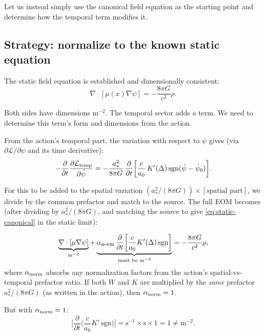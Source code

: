 \documentclass[11pt]{article}
\begin{document}
Let us instead simply use the canonical field equation as the starting point and determine how the temporal term modifies it.

\subsection{Strategy: normalize to the known static equation}

The static field equation is established and dimensionally consistent:
\begin{equation}
\nabla\cdot[\mu(x)\nabla\psi] = -\frac{8\pi G}{c^2}\rho.
\label{eq:static-canonical}
\end{equation}

Both sides have dimensions $\text{m}^{-2}$. The temporal sector adds a term. We need to determine this term's form and dimensions from the action.

From the action's temporal part, the variation with respect to $\psi$ gives (via $\partial\mathcal{L}/\partial\dot\psi$ and its time derivative):
\begin{equation}
-\frac{\partial}{\partial t}\frac{\partial\mathcal{L}_{\rm temp}}{\partial\dot\psi}
= -\frac{a_*^2}{8\pi G}\,\frac{\partial}{\partial t}\biggl[
\frac{c}{a_0}\,K'(\Delta)\,\text{sgn}(\dot\psi - \dot\psi_0)\biggr].
\end{equation}

For this to be added to the spatial variation $(a_*^2/(8\pi G)) \times [\text{spatial part}]$, we divide by the common prefactor and match to the source. The full EOM becomes (after dividing by $a_*^2/(8\pi G)$, and matching the source to give \eqref{eq:static-canonical} in the static limit):

\begin{equation}
\underbrace{\nabla\cdot[\mu\nabla\psi]}_{\text{m}^{-2}}
+ \underbrace{\alpha_{\rm norm}\,\frac{\partial}{\partial t}\biggl[\frac{c}{a_0}K'(\Delta)\,\text{sgn}\biggr]}_{\text{must be m}^{-2}}
= -\frac{8\pi G}{c^2}\rho,
\label{eq:full-eom-attempt}
\end{equation}
where $\alpha_{\rm norm}$ absorbs any normalization factors from the action's spatial-vs-temporal prefactor ratio. If both $W$ and $K$ are multiplied by the \emph{same} prefactor $a_*^2/(8\pi G)$ (as written in the action), then $\alpha_{\rm norm} = 1$.

But with $\alpha_{\rm norm} = 1$:
\begin{equation}
\biggl[\frac{\partial}{\partial t}\biggl(\frac{c}{a_0}K'\,\text{sgn}\biggr)\biggr]
= \text{s}^{-1} \times \text{s} \times 1 = 1 \neq \text{m}^{-2}.
\end{equation}
\end{document}
